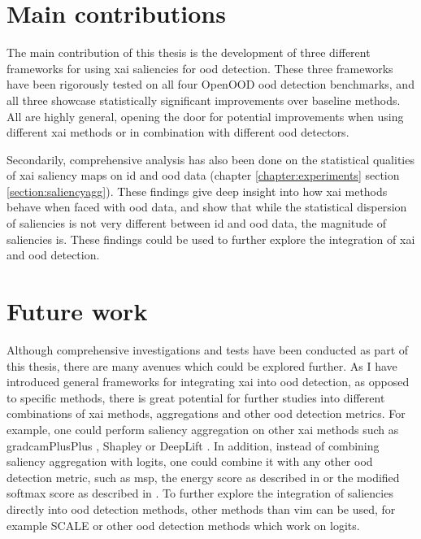 \documentclass[UKenglish]{uiomasterthesis} %
\theoremstyle{definition}
\begin{document}
\section{Main contributions}

The main contribution of this thesis is the development of three different frameworks for using \ac{xai} saliencies for \ac{ood} detection. These three frameworks have been rigorously tested on all four OpenOOD \ac{ood} detection benchmarks, and all three showcase statistically significant improvements over baseline methods. All are highly general, opening the door for potential improvements when using different \ac{xai} methods or in combination with different \ac{ood} detectors.

Secondarily, comprehensive analysis has also been done on the statistical qualities of \ac{xai} saliency maps on \ac{id} and \ac{ood} data (chapter \ref{chapter:experiments} section \ref{section:saliencyagg}). These findings give deep insight into how \ac{xai} methods behave when faced with \ac{ood} data, and show that while the statistical dispersion of saliencies is not very different between \ac{id} and \ac{ood} data, the magnitude of saliencies is. These findings could be used to further explore the integration of \ac{xai} and \ac{ood} detection.


\section{Future work} \label{section:future}

Although comprehensive investigations and tests have been conducted as part of this thesis, there are many avenues which could be explored further. As I have introduced general frameworks for integrating \ac{xai} into \ac{ood} detection, as opposed to specific methods, there is great potential for further studies into different combinations of \ac{xai} methods, aggregations and other \ac{ood} detection metrics. For example, one could perform saliency aggregation on other \ac{xai} methods such as \ac{gradcam}PlusPlus \cite{gradcamplusplus}, Shapley \cite{shapley} or DeepLift \cite{deeplift}. In addition, instead of combining saliency aggregation with logits, one could combine it with any other \ac{ood} detection metric, such as \ac{msp}, the energy score as described in \cite{energy} or the modified softmax score as described in \cite{odin}. To further explore the integration of saliencies directly into \ac{ood} detection methods, other methods than \ac{vim} can be used, for example SCALE \cite{scale} or other \ac{ood} detection methods which work on logits.
\end{document}
